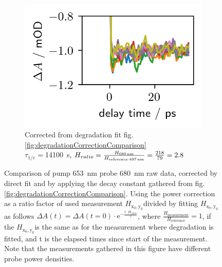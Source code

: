 \documentclass[twoside,openright,listof=numbered]{scrreprt}
\def\radiantExp{\ensuremath{H_\mathrm{x_0,y_0}}}
\begin{document}
\begin{figure}[hbtp]
\begin{subfigure}[t]{0.3215\linewidth}
\includegraphics[width=\columnwidth]{images/PowerVarHigh_CorrEstimate12600_2.8.png} 
\caption{Corrected from degradation fit fig. \ref{fig:degradationCorrectionComparison}\\
$\tau_{1/e}=$\SI{14100}{\second}, $H_{ratio}=\frac{H_\text{\SI{680}{\nano\meter}}}{H_\text{reference:\SI{497}{\nano\meter}}} = \frac{218}{79}= 2.8$}
\end{subfigure}
\caption[Comparison of pump \SI{653}{\nano\meter} probe \SI{680}{\nano\meter} raw data, degradation corrected by directly fitted and adapted, power corrected, decay constant.]{Comparison of pump \SI{653}{\nano\meter} probe \SI{680}{\nano\meter} raw data, corrected by direct fit and by applying the decay constant gathered from fig. \ref{fig:degradationCorrectionComparison}. Using the power correction as a ratio factor of used measurement \radiantExp divided by fitting \radiantExp as follows $\Delta A(t) = \Delta A(t=0)\cdot \mathrm{e}^{-\frac{t\cdot H_{ratio}}{\tau}}$, where $\frac{H_\mathrm{measurement}}{H_\mathrm{reference}} =1$, if the \radiantExp is the same as for the measurement where degradation is fitted, and t is the elapsed times since start of the measurement. Note that the measurements gathered in this figure have different probe power densities.\label{fig:powerVarCorrection}}
\end{figure}
\end{document}
